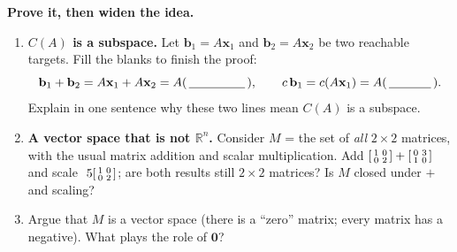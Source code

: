 \documentclass[10pt]{article}
\newcommand{\xx}{\mathbf{x}}
\newcommand{\bb}{\mathbf{b}}
\newcommand{\zero}{\mathbf{0}}
\begin{document}
\begin{tcolorbox}[colback=white, colframe=black!40, title=\textbf{Tier E --- Extension},
    fonttitle=\bfseries, arc=1.5mm, left=3mm, right=3mm, top=2mm, bottom=2mm, breakable]
\textbf{Prove it, then widen the idea.}
\begin{enumerate}[leftmargin=1.7em, itemsep=9pt]
  \item \textbf{$C(A)$ is a subspace.} Let $\bb_1=A\xx_1$ and $\bb_2=A\xx_2$ be two reachable
        targets. Fill the blanks to finish the proof:
        \[ \bb_1+\bb_2=A\xx_1+A\xx_2=A(\,\blank{1.6cm}\,), \qquad c\,\bb_1=c(A\xx_1)=A(\,\blank{1.2cm}\,). \]
        Explain in one sentence why these two lines mean $C(A)$ is a subspace. 
  \item \textbf{A vector space that is not $\mathbb{R}^n$.} Consider $M$ = the set of \emph{all}
        $2\times2$ matrices, with the usual matrix addition and scalar multiplication. Add
        $\begin{bsmallmatrix} 1 & 0 \\ 0 & 2 \end{bsmallmatrix}+\begin{bsmallmatrix} 0 & 3 \\ 1 & 0 \end{bsmallmatrix}$
        and scale $\ 5\begin{bsmallmatrix} 1 & 0 \\ 0 & 2 \end{bsmallmatrix}$; are both results still
        $2\times2$ matrices? Is $M$ closed under $+$ and scaling? 
  \item Argue that $M$ is a vector space (there is a ``zero'' matrix; every matrix has a negative).
        What plays the role of $\zero$? 
\end{enumerate}
\end{tcolorbox}
\end{document}
